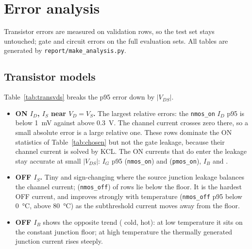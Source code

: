\section{Error analysis}\label{sec:error}

Transistor errors are measured on validation rows, so the test set stays untouched; gate and
circuit errors on the full evaluation sets. All tables are generated by
\texttt{report/make\_analysis.py}.

\subsection{Transistor models}\label{sec:errtrans}
Table~\ref{tab:transvds} breaks the p95 error down by $|V_{DS}|$.
\begin{itemize}
  \item \textbf{ON $I_D$, $I_S$ near $V_D=V_S$.} The largest relative errors: the \texttt{nmos\_on}
        $I_D$ p95 is \TrVdsLowNmosOnId{} below \qty{1}{\milli\volt} against \TrVdsHighNmosOnId{}
        above \qty{0.3}{\volt}. The channel current crosses zero there, so a small absolute error
        is a large relative one. These rows dominate the ON statistics of
        Table~\ref{tab:chosen} but not the gate leakage, because their channel current is solved
        by KCL. The ON currents that do enter the leakage stay accurate at small $|V_{DS}|$:
        $I_G$ p95 \TrVdsLowNmosOnIg{} (\texttt{nmos\_on}) and \TrVdsLowPmosOnIg{}
        (\texttt{pmos\_on}), $I_B$ \TrVdsLowNmosOnIb{} and \TrVdsLowPmosOnIb.
  \item \textbf{OFF $I_S$.} Tiny and sign-changing where the source junction leakage balances
        the channel current; \BelowFloorNmosOffIs{} (\texttt{nmos\_off}) of rows lie below the
        floor. It is the hardest OFF current, and improves strongly with temperature
        (\texttt{nmos\_off} p95 \TrTempColdNmosOffIs{} below \qty{0}{\degreeCelsius},
        \TrTempHotNmosOffIs{} above \qty{80}{\degreeCelsius}) as the subthreshold current moves
        away from the floor.
  \item \textbf{OFF $I_B$} shows the opposite trend (\TrTempColdNmosOffIb{} cold,
        \TrTempHotNmosOffIb{} hot): at low temperature it sits on the constant junction floor; at
        high temperature the thermally generated junction current rises steeply.
\end{itemize}

\begin{table}[H]
  \centering
  \small
  \caption{Validation p95 error per current and $|V_{DS}|$ band (``--'': fewer than \MinBinRows{}
  rows; OFF cases have few rows at $V_{DS}\approx0$ because of pinning).}
  \label{tab:transvds}
  \fittable{}
\end{table}

